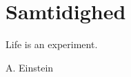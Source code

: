 \chapter{Samtidighed}
\label{sec:Samtidighed}
\epigraph{Life is an experiment.}{A. Einstein}
\minitoc
\clearpage

\lipsum